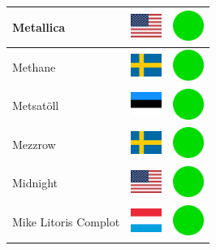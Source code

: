 \documentclass[12pt, a4paper, twoside]{report}
\begin{document}
\begin{center}
\begin{longtable}{|p{5cm}|p{2cm}|p{2cm}|}
 Metallica                                                  & \includegraphics[width=1cm]{../img/flags/us} &   \includegraphics[width=1cm]{../likes/y} \\ \hline
 Methane                                                    & \includegraphics[width=1cm]{../img/flags/se} &   \includegraphics[width=1cm]{../likes/y} \\ \hline
 Metsatöll                                                  & \includegraphics[width=1cm]{../img/flags/ee} &   \includegraphics[width=1cm]{../likes/y} \\ \hline
 Mezzrow                                                    & \includegraphics[width=1cm]{../img/flags/se} &   \includegraphics[width=1cm]{../likes/y} \\ \hline
 Midnight                                                   & \includegraphics[width=1cm]{../img/flags/us} &   \includegraphics[width=1cm]{../likes/y} \\ \hline
 Mike Litoris Complot                                       & \includegraphics[width=1cm]{../img/flags/lu} &   \includegraphics[width=1cm]{../likes/y} \\ \hline

\end{longtable}
\end{center}
\end{document}

